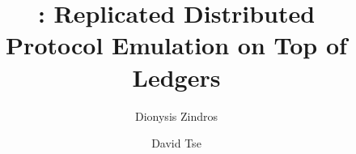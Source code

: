 \title{
  \rollerblade:
  Replicated Distributed\\
  Protocol Emulation on Top of Ledgers
}
\ifanonymous{\iflncs
\author{}\institute{}
\fi}
\else
\author{
  Dionysis Zindros\and
  David Tse
}
\iflncs
{}
\else
{}
\fi
\fi
